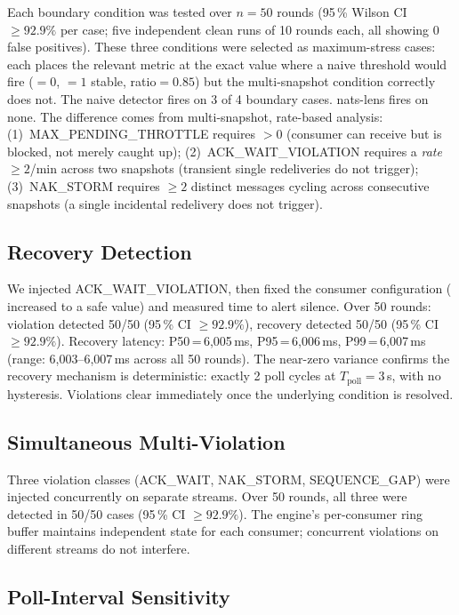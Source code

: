 \documentclass[sigconf,nonacm]{acmart}
\begin{document}
Each boundary condition was tested over $n{=}50$ rounds (95\,\% Wilson
CI $\geq 92.9\%$ per case; five independent clean runs of 10 rounds
each, all showing 0 false positives).
These three conditions were selected as maximum-stress cases: each places
the relevant metric at the exact value where a naive threshold would fire
(${=}0$, ${=}1$ stable,
ratio${=}0.85$) but the multi-snapshot condition correctly does not.
The naive detector fires on 3 of 4 boundary cases. nats-lens fires on
none. The difference comes from multi-snapshot, rate-based analysis:
(1)~MAX\_PENDING\_\allowbreak THROTTLE requires ${}>0$
(consumer can receive but is blocked, not merely caught up);
(2)~ACK\_WAIT\_\allowbreak VIOLATION requires a \emph{rate} $\geq 2$/min
across two snapshots (transient single redeliveries do not trigger);
(3)~NAK\_STORM requires $\geq 2$ distinct messages cycling across
consecutive snapshots (a single incidental redelivery does not trigger).

\subsection{Recovery Detection}

We injected ACK\_WAIT\_\allowbreak VIOLATION, then fixed the consumer
configuration ( increased to a safe value) and measured
time to alert silence.
Over 50 rounds: violation detected 50/50 (95\,\% CI $\geq 92.9\%$),
recovery detected 50/50 (95\,\% CI $\geq 92.9\%$).
Recovery latency: P50\,=\,6{,}005\,ms, P95\,=\,6{,}006\,ms,
P99\,=\,6{,}007\,ms (range: 6{,}003--6{,}007\,ms across all 50 rounds).
The near-zero variance confirms the recovery mechanism is deterministic:
exactly 2 poll cycles at $T_\mathrm{poll}{=}3$\,s, with no hysteresis.
Violations clear immediately once the underlying condition is resolved.

\subsection{Simultaneous Multi-Violation}

Three violation classes (ACK\_WAIT, NAK\_STORM, SEQUENCE\_GAP) were
injected concurrently on separate streams.
Over 50 rounds, all three were detected in 50/50 cases
(95\,\% CI $\geq 92.9\%$).
The engine's per-consumer ring buffer maintains independent state for each
consumer; concurrent violations on different streams do not interfere.

\subsection{Poll-Interval Sensitivity}
\end{document}
